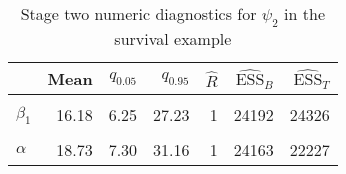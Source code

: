 \begin{table}

\caption{\label{tab:surv-stage-two-diag-psi-2}Stage two numeric diagnostics for $\psi_{2}$ in the survival example}
\centering
\begin{tabular}[t]{lrrrrrr}
\toprule
  & Mean & $q_{0.05}$ & $q_{0.95}$ & $\widehat{R}$ & $\widehat{\text{ESS}}_{B}$ & $\widehat{\text{ESS}}_{T}$\\
\midrule
\cellcolor{gray!6}{$\beta_{0}$} & \cellcolor{gray!6}{6.51} & \cellcolor{gray!6}{1.91} & \cellcolor{gray!6}{11.48} & \cellcolor{gray!6}{1} & \cellcolor{gray!6}{23100} & \cellcolor{gray!6}{22190}\\
$\beta_{1}$ & 16.18 & 6.25 & 27.23 & 1 & 24192 & 24326\\
\cellcolor{gray!6}{$\gamma$} & \cellcolor{gray!6}{10.05} & \cellcolor{gray!6}{7.23} & \cellcolor{gray!6}{13.40} & \cellcolor{gray!6}{1} & \cellcolor{gray!6}{16591} & \cellcolor{gray!6}{19613}\\
$\alpha$ & 18.73 & 7.30 & 31.16 & 1 & 24163 & 22227\\
\bottomrule
\end{tabular}
\end{table}